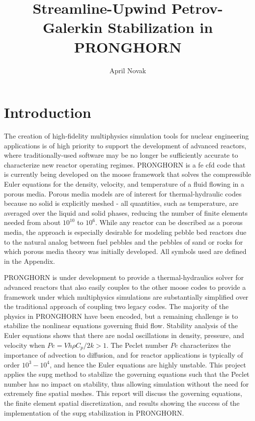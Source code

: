 \documentclass[10pt]{article}
\numberwithin{equation}{section} %
\begin{document}
\title{Streamline-Upwind Petrov-Galerkin Stabilization in PRONGHORN}
\author{April Novak}
\maketitle

\clearpage
\section{Introduction}

The creation of high-fidelity multiphysics simulation tools for nuclear engineering applications is of high priority to support the development of advanced reactors, where traditionally-used software may be no longer be sufficiently accurate to characterize new reactor operating regimes. PRONGHORN is a \gls{fe} \gls{cfd} code that is currently being developed on the \gls{moose} framework that solves the compressible Euler equations for the density, velocity, and temperature of a fluid flowing in a porous media. Porous media models are of interest for thermal-hydraulic codes because no solid is explicitly meshed - all quantities, such as temperature, are averaged over the liquid and solid phases, reducing the number of finite elements needed from about \(10^{10}\) to \(10^6\). While any reactor can be described as a porous media, the approach is especially desirable for modeling pebble bed reactors due to the natural analog between fuel pebbles and the pebbles of sand or rocks for which porous media theory was initially developed. All symbols used are defined in the Appendix.

PRONGHORN is under development to provide a thermal-hydraulics solver for advanced reactors that also easily couples to the other
\gls{moose} codes to provide a framework under which multiphysics simulations are substantially simplified over the traditional approach of coupling two legacy codes. The majority of the physics in PRONGHORN have been encoded, but a remaining challenge is to stabilize the nonlinear equations governing fluid flow. Stability analysis of the Euler equations shows that there are nodal oscillations in density, pressure, and velocity when \(Pe=Vh\rho C_p/2k>1\). The Peclet number \(Pe\) characterizes the importance of advection to diffusion, and for reactor applications is typically of order \(10^3-10^4\), and hence the Euler equations are highly unstable. This project applies the \gls{supg} method to stabilize the governing equations such that the Peclet number has no impact on stability, thus allowing simulation without the need for extremely fine spatial meshes. This report will discuss the governing equations, the finite element spatial discretization, and results showing the success of the implementation of the \gls{supg} stabilization in PRONGHORN. 
\end{document}
